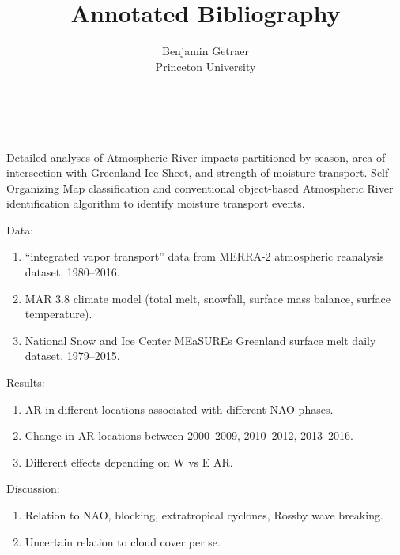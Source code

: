 \documentclass [11pt]{article}
\title{Annotated Bibliography}
\author{Benjamin Getraer\\Princeton University}
\newcommand{\entry}[2]{\hl{\cite{#1}}\\\\ \indent\indent #2}
\newcommand{\hl}[1]{\colorbox{yellow}{\textcolor{red}{#1}}}
\begin{document}
\maketitle

\entry{mattingly2018}{Detailed analyses of Atmospheric River impacts partitioned by season, area of intersection with Greenland Ice Sheet, and strength of moisture transport. Self-Organizing Map classification and conventional object-based Atmospheric River identification algorithm to identify moisture transport events.

Data: 
\begin{enumerate}
\item ``integrated vapor transport'' data from MERRA-2 atmospheric reanalysis dataset, 1980--2016.
\item MAR 3.8 climate model (total melt, snowfall, surface mass balance, surface temperature).
\item National Snow and Ice Center MEaSUREs Greenland surface melt daily dataset, 1979--2015.
\end{enumerate}

Results:
\begin{enumerate}
\item AR in different locations associated with different NAO phases.
\item Change in AR locations between 2000--2009, 2010--2012, 2013--2016.
\item Different effects depending on W vs E AR.
\end{enumerate}
Discussion:
\begin{enumerate}
\item Relation to NAO, blocking, extratropical cyclones, Rossby wave breaking.
\item Uncertain relation to cloud cover per se.
\end{enumerate}
}

\entry{mattingly2018}




\end{document}
